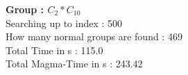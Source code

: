 \textbf{Group : $C_2*C_{10}$}\\
Searching up to index : 500\\
How many normal groups are found : 469\\
Total Time in s : 115.0\\
Total Magma-Time in s : 243.42\\
